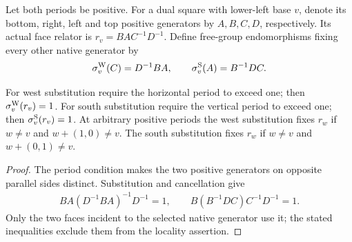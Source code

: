 \begin{definition}
    \label{def:peps_dual_face_generator_elimination}
    \leanok
    Let both periods be positive. For a dual square with lower-left base $v$,
    denote its bottom, right, left and top positive generators by $A,B,C,D$,
    respectively. Its actual face relator is $r_v=BAC^{-1}D^{-1}$.
    Define free-group endomorphisms fixing every other native generator by
    \begin{align}
        \sigma_v^{\rm W}(C)=D^{-1}BA,\qquad
        \sigma_v^{\rm S}(A)=B^{-1}DC.
        \label{eq:peps_dual_face_generator_substitution}
    \end{align}
\end{definition}

\begin{lemma}
    \label{lem:peps_dual_face_elimination_locality}
    \leanok
    For west substitution require the horizontal period to exceed one;
    then $\sigma_v^{\rm W}(r_v)=1$.
    For south substitution require the vertical period to exceed one;
    then $\sigma_v^{\rm S}(r_v)=1$.
    At arbitrary positive periods the west substitution fixes $r_w$ if
    $w\ne v$ and $w+(1,0)\ne v$. The south substitution fixes $r_w$ if
    $w\ne v$ and $w+(0,1)\ne v$.
\end{lemma}
\begin{proof}\leanok
    The period condition makes the two positive generators on opposite
    parallel sides distinct. Substitution and cancellation give
    \begin{align}
        BA(D^{-1}BA)^{-1}D^{-1}=1,\qquad
        B(B^{-1}DC)C^{-1}D^{-1}=1.
        \label{eq:peps_dual_face_elimination_cancellation}
    \end{align}
    Only the two faces incident to the selected native generator use it;
    the stated inequalities exclude them from the locality assertion.
\end{proof}

